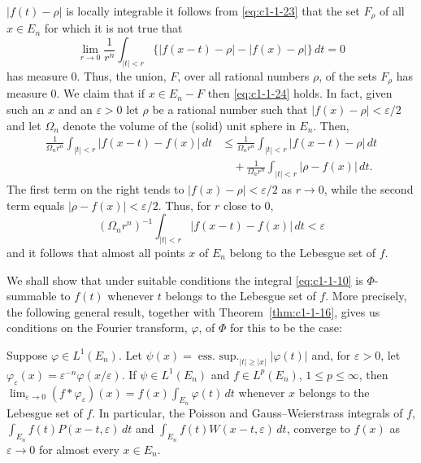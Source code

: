 $|f(t) - \rho|$ is locally integrable it follows from \eqref{eq:c1-1-23} that the
set $F_{\rho}$ of all $x \in E_{n}$ for which it is not true that
\[
\lim_{r\to0}\frac{1}{r^{n}}\int_{|t|<r}\{|f(x-t)-\rho|-|f(x)-\rho|\}\,dt=0
\]
has measure $0$. Thus, the union, $F$, over all rational numbers $\rho$, of the
sets $F_{\rho}$ has measure $0$. We claim that if $x \in E_{n} - F$ then
\eqref{eq:c1-1-24} holds. In fact, given such an $x$ and an $\varepsilon > 0$
let $\rho$ be a rational number such that $|f(x) - \rho| < \varepsilon/2$ and let
$\Omega_{n}$ denote the volume of the (solid) unit sphere in $E_{n}$. Then,
\begin{align*}
\frac{1}{\Omega_{n} r^{n}}\int_{|t|<r}|f(x-t)-f(x)|\,dt
&\leq\frac{1}{\Omega_{n} r^{n}}\int_{|t|<r}|f(x-t)-\rho|\,dt\\
&\quad+\frac{1}{\Omega_{n} r^{n}}\int_{|t|<r}|\rho-f(x)|\,dt.
\end{align*}
The first term on the right tends to $|f(x) - \rho| < \varepsilon/2$ as
$r \to 0$, while the second term equals $|\rho - f(x)| < \varepsilon/2$. Thus,
for $r$ close to $0$,
\[
(\Omega_{n}r^{n})^{-1}\int_{|t|<r}|f(x-t)-f(x)|\,dt<\varepsilon
\]
and it follows that almost all points $x$ of $E_{n}$ belong to the Lebesgue set
of $f$.

We shall show that under suitable conditions the integral \eqref{eq:c1-1-10} is
$\Phi$-summable to $f(t)$ whenever $t$ belongs to the Lebesgue set of $f$. More
precisely, the following general result, together with
Theorem~\ref{thm:c1-1-16}, gives us conditions on the Fourier transform,
$\varphi$, of $\Phi$ for this to be the case:

\begin{theorem}\label{thm:c1-1-25}
Suppose $\varphi \in L^{1}(E_{n})$. Let
$\psi(x) = \operatorname{ess.\ sup.}_{|t| \geq |x|}|\varphi(t)|$ and, for
$\varepsilon > 0$, let $\varphi_{\varepsilon}(x) = \varepsilon^{-n}\varphi(x/\varepsilon)$.
If $\psi \in L^{1}(E_{n})$ and $f \in L^{p}(E_{n})$, $1 \leq p \leq \infty$, then
$\lim_{\varepsilon \to 0}(f * \varphi_{\varepsilon})(x) = f(x) \int_{E_{n}} \varphi(t) \, dt$
whenever $x$ belongs to the Lebesgue set of $f$. In particular, the Poisson and
Gauss--Weierstrass integrals of $f$,
$\int_{E_{n}} f(t)P(x - t, \varepsilon) \, dt$ and
$\int_{E_{n}} f(t)W(x - t, \varepsilon) \, dt$, converge to $f(x)$ as
$\varepsilon \to 0$ for almost every $x \in E_{n}$.
\end{theorem}


